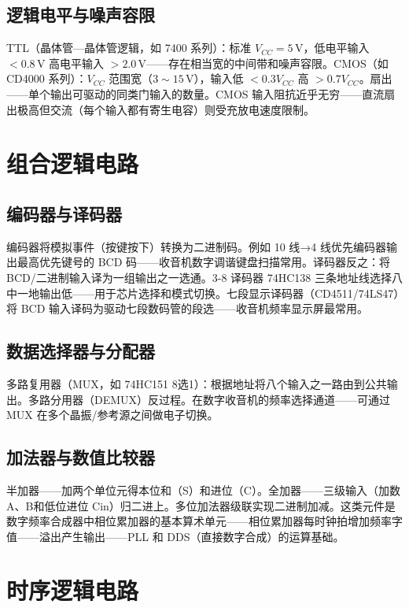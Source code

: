 \documentclass[12pt,UTF8]{ctexbook}
\begin{document}
\subsection{逻辑电平与噪声容限}

TTL（晶体管—晶体管逻辑，如 7400 系列）：标准 $V_{CC}=5\,\mathrm{V}$，低电平输入 $<0.8\,\mathrm{V}$ 高电平输入 $>2.0\,\mathrm{V}$——存在相当宽的中间带和噪声容限。CMOS（如 CD4000 系列）：$V_{CC}$ 范围宽（$3\sim15\,\mathrm{V}$），输入低 $<0.3V_{CC}$ 高 $>0.7V_{CC}$。扇出——单个输出可驱动的同类门输入的数量。CMOS 输入阻抗近乎无穷——直流扇出极高但交流（每个输入都有寄生电容）则受充放电速度限制。

\section{组合逻辑电路}
\label{sec:combinational_logic}

\subsection{编码器与译码器}

编码器将模拟事件（按键按下）转换为二进制码。例如 10 线→4 线优先编码器输出最高优先键号的 BCD 码——收音机数字调谐键盘扫描常用。译码器反之：将 BCD/二进制输入译为一组输出之一选通。3-8 译码器 74HC138 三条地址线选择八中一地输出低——用于芯片选择和模式切换。七段显示译码器（CD4511/74LS47）将 BCD 输入译码为驱动七段数码管的段选——收音机频率显示屏最常用。

\subsection{数据选择器与分配器}

多路复用器（MUX，如 74HC151 8选1）：根据地址将八个输入之一路由到公共输出。多路分用器（DEMUX）反过程。在数字收音机的频率选择通道——可通过 MUX 在多个晶振/参考源之间做电子切换。

\subsection{加法器与数值比较器}

半加器——加两个单位元得本位和（S）和进位（C）。全加器——三级输入（加数A、B和低位进位 Cin）归二进上。多位加法器级联实现二进制加减。这类元件是数字频率合成器中相位累加器的基本算术单元——相位累加器每时钟拍增加频率字值——溢出产生输出——PLL 和 DDS（直接数字合成）的运算基础。

\section{时序逻辑电路}
\label{sec:sequential_logic}
\end{document}
